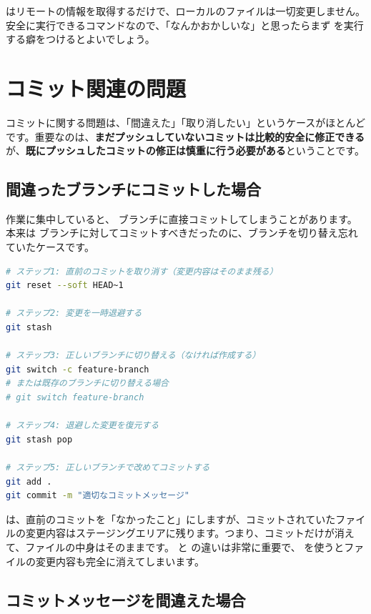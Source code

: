  はリモートの情報を取得するだけで、ローカルのファイルは一切変更しません。安全に実行できるコマンドなので、「なんかおかしいな」と思ったらまず  を実行する癖をつけるとよいでしょう。

\section{コミット関連の問題}

コミットに関する問題は、「間違えた」「取り消したい」というケースがほとんどです。重要なのは、\textbf{まだプッシュしていないコミットは比較的安全に修正できる}が、\textbf{既にプッシュしたコミットの修正は慎重に行う必要がある}ということです。

\subsection{間違ったブランチにコミットした場合}

作業に集中していると、 ブランチに直接コミットしてしまうことがあります。本来は  ブランチに対してコミットすべきだったのに、ブランチを切り替え忘れていたケースです。

\begin{lstlisting}[language=bash]
# ステップ1: 直前のコミットを取り消す（変更内容はそのまま残る）
git reset --soft HEAD~1

# ステップ2: 変更を一時退避する
git stash

# ステップ3: 正しいブランチに切り替える（なければ作成する）
git switch -c feature-branch
# または既存のブランチに切り替える場合
# git switch feature-branch

# ステップ4: 退避した変更を復元する
git stash pop

# ステップ5: 正しいブランチで改めてコミットする
git add .
git commit -m "適切なコミットメッセージ"
\end{lstlisting}

 は、直前のコミットを「なかったこと」にしますが、コミットされていたファイルの変更内容はステージングエリアに残ります。つまり、コミットだけが消えて、ファイルの中身はそのままです。 と  の違いは非常に重要で、 を使うとファイルの変更内容も完全に消えてしまいます。

\subsection{コミットメッセージを間違えた場合}

